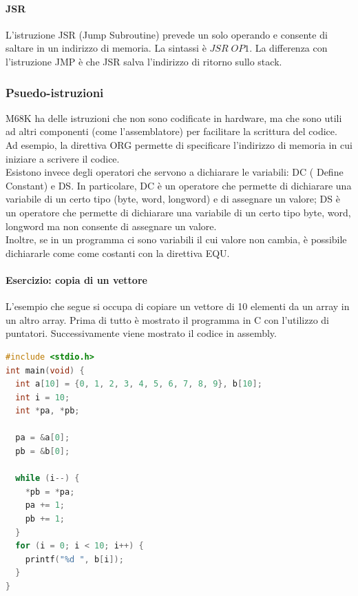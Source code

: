 \documentclass{article}
\begin{document}
\paragraph{JSR} L'istruzione JSR (Jump Subroutine) prevede un solo operando e 
consente di saltare in un indirizzo di memoria. La sintassi è $JSR\;OP1$.
La differenza con l'istruzione JMP è che JSR salva l'indirizzo di ritorno
sullo stack.

\subsubsection{Psuedo-istruzioni}
M68K ha delle istruzioni che non sono codificate in hardware,
ma che sono utili ad altri componenti (come l'assemblatore) per facilitare la
scrittura del codice. Ad esempio, la direttiva ORG permette di specificare 
l'indirizzo di memoria in cui iniziare a scrivere il codice.\\ 
Esistono invece degli operatori che servono a dichiarare le variabili: DC (
Define Constant) e DS. In particolare, DC è un operatore che permette di 
dichiarare una variabile di un certo tipo (byte, word, longword) e di 
assegnare un valore;
DS è un operatore che permette di dichiarare una variabile di un certo tipo
{byte, word, longword} ma non consente di assegnare un valore.\\

Inoltre, se in un programma ci sono variabili il cui valore non cambia, 
è possibile dichiararle come come costanti con la direttiva EQU.

\paragraph{Esercizio: copia di un vettore}
L'esempio che segue si occupa di copiare un vettore di 10 elementi da un array 
in un altro array. Prima di tutto è mostrato il programma in C con
l'utilizzo di puntatori. Successivamente viene mostrato il codice in assembly.


\begin{lstlisting}[caption={Copia di un vettore in C}, language=C]
#include <stdio.h>
int main(void) {
  int a[10] = {0, 1, 2, 3, 4, 5, 6, 7, 8, 9}, b[10];
  int i = 10;
  int *pa, *pb;

  pa = &a[0];
  pb = &b[0];

  while (i--) {
    *pb = *pa;
    pa += 1;
    pb += 1;
  }
  for (i = 0; i < 10; i++) {
    printf("%d ", b[i]);
  }
}
\end{lstlisting}
\end{document}
